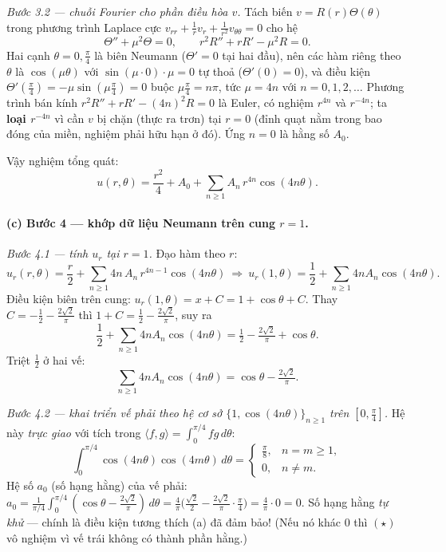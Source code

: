 \emph{Bước 3.2 --- chuỗi Fourier cho phần điều hòa $v$.} Tách biến $v=R(r)\Theta(\theta)$ trong phương trình Laplace cực $v_{rr}+\tfrac{1}{r}v_r+\tfrac{1}{r^2}v_{\theta\theta}=0$ cho hệ
\[
  \Theta''+\mu^2\Theta=0,\qquad r^2R''+rR'-\mu^2 R=0.
\]
Hai cạnh $\theta=0,\tfrac{\pi}{4}$ là biên Neumann ($\Theta'=0$ tại hai đầu), nên các hàm riêng theo $\theta$ là $\cos(\mu\theta)$ với $\sin(\mu\cdot0)\cdot\mu=0$ tự thoả ($\Theta'(0)=0$), và điều kiện $\Theta'(\tfrac{\pi}{4})=-\mu\sin(\mu\tfrac{\pi}{4})=0$ buộc $\mu\tfrac{\pi}{4}=n\pi$, tức $\mu=4n$ với $n=0,1,2,\dots$ Phương trình bán kính $r^2 R''+rR'-(4n)^2 R=0$ là Euler, có nghiệm $r^{4n}$ và $r^{-4n}$; ta \textbf{loại $r^{-4n}$} vì cần $v$ bị chặn (thực ra trơn) tại $r=0$ (đỉnh quạt nằm trong bao đóng của miền, nghiệm phải hữu hạn ở đó). Ứng $n=0$ là hằng số $A_0$.

Vậy nghiệm tổng quát:
\[
  u(r,\theta)=\frac{r^2}{4}+A_0+\sum_{n\ge1}A_n\,r^{4n}\cos(4n\theta).
\]

\paragraph{(c) Bước 4 --- khớp dữ liệu Neumann trên cung $r=1$.}\leavevmode

\emph{Bước 4.1 --- tính $u_r$ tại $r=1$.} Đạo hàm theo $r$:
\[
  u_r(r,\theta)=\frac{r}{2}+\sum_{n\ge1}4n\,A_n\,r^{4n-1}\cos(4n\theta)
  \ \Longrightarrow\ u_r(1,\theta)=\frac12+\sum_{n\ge1}4nA_n\cos(4n\theta).
\]
Điều kiện biên trên cung: $u_r(1,\theta)=x+C=1+\cos\theta+C$. Thay $C=-\tfrac12-\tfrac{2\sqrt2}{\pi}$ thì $1+C=\tfrac12-\tfrac{2\sqrt2}{\pi}$, suy ra
\[
  \frac12+\sum_{n\ge1}4nA_n\cos(4n\theta)=\tfrac12-\tfrac{2\sqrt2}{\pi}+\cos\theta.
\]
Triệt $\tfrac12$ ở hai vế:
\[
  \sum_{n\ge1}4nA_n\cos(4n\theta)=\cos\theta-\tfrac{2\sqrt2}{\pi}.\tag{$\star$}
\]

\emph{Bước 4.2 --- khai triển vế phải theo hệ cơ sở $\{1,\cos(4n\theta)\}_{n\ge1}$ trên $[0,\tfrac{\pi}{4}]$.} Hệ này \emph{trực giao} với tích trong $\langle f,g\rangle=\int_0^{\pi/4}fg\,d\theta$:
\[
  \int_0^{\pi/4}\!\!\cos(4n\theta)\cos(4m\theta)\,d\theta=
  \begin{cases}\tfrac{\pi}{8},& n=m\ge1,\\ 0,& n\ne m.\end{cases}
\]
Hệ số $a_0$ (số hạng hằng) của vế phải: $a_0=\tfrac{1}{\pi/4}\int_0^{\pi/4}(\cos\theta-\tfrac{2\sqrt2}{\pi})\,d\theta=\tfrac{4}{\pi}\big(\tfrac{\sqrt2}{2}-\tfrac{2\sqrt2}{\pi}\cdot\tfrac{\pi}{4}\big)=\tfrac{4}{\pi}\cdot0=0$. Số hạng hằng \emph{tự khử} --- chính là điều kiện tương thích (a) đã đảm bảo! (Nếu nó khác $0$ thì $(\star)$ vô nghiệm vì vế trái không có thành phần hằng.)

